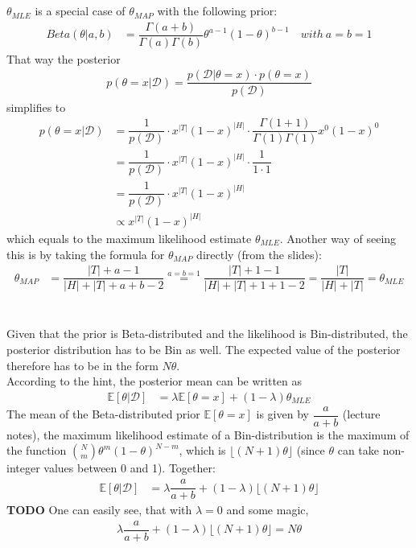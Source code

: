 \documentclass[11pt]{article}
\newcommand{\exercise}{\section{}}
\begin{document}
\exercise
$\theta_{MLE}$ is a special case of $\theta_{MAP}$ with the following prior:
\begin{align*}
	Beta(\theta|a,b) &= \dfrac{\Gamma(a+b)}{\Gamma(a)\Gamma(b)}\theta^{a-1}(1-\theta)^{b-1} \quad with\ a=b=1
\end{align*}
That way the posterior 
\begin{align*}
	p(\theta=x|\mathcal{D}) = \dfrac{p(\mathcal{D}|\theta=x) \cdot p(\theta=x)}{p(\mathcal{D})}
\end{align*}
simplifies to
\begin{align*}
	p(\theta=x|\mathcal{D}) &= \dfrac{1}{p(\mathcal{D})} \cdot x^{|T|} (1-x)^{|H|} \cdot \dfrac{\Gamma(1+1)}{\Gamma(1)\Gamma(1)} x^{0}(1-x)^{0} \\
	&= \dfrac{1}{p(\mathcal{D})} \cdot x^{|T|} (1-x)^{|H|} \cdot \dfrac{1}{1 \cdot 1} \\
	&= \dfrac{1}{p(\mathcal{D})} \cdot x^{|T|} (1-x)^{|H|} \\
	&\propto x^{|T|} (1-x)^{|H|}
\end{align*}
which equals to the maximum likelihood estimate $\theta_{MLE}$. Another way of seeing this is by taking the formula for $\theta_{MAP}$ directly (from the slides):
\begin{align*}
	\theta_{MAP} &= \dfrac{|T| + a - 1}{|H| + |T| + a + b - 2} \stackrel{a=b=1}{=} \dfrac{|T| + 1 - 1}{|H| + |T| + 1 + 1 - 2} = \dfrac{|T|}{|H| + |T|} = \theta_{MLE}
\end{align*}

\exercise
Given that the prior is Beta-distributed and the likelihood is Bin-distributed, the posterior distribution has to be Bin as well. The expected value of the posterior therefore has to be in the form $N\theta$.\\

\noindent According to the hint, the posterior mean can be written as
\begin{align*}
	\mathbb{E}[\theta|\mathcal{D}] &= \lambda\mathbb{E}[\theta = x] + (1-\lambda)\theta_{MLE}
\end{align*}
The mean of the Beta-distributed prior $\mathbb{E}[\theta = x]$ is given by $\dfrac{a}{a+b}$ (lecture notes), the maximum likelihood estimate of a Bin-distribution is the maximum of the function $\binom{N}{m}\theta^m(1-\theta)^{N-m}$, which is $\lfloor(N+1)\theta\rfloor$ (since $\theta$ can take non-integer values between 0 and 1). Together:
\begin{align*}
\mathbb{E}[\theta|\mathcal{D}] &= \lambda\dfrac{a}{a+b} + (1-\lambda)\lfloor(N+1)\theta\rfloor
\end{align*}
\textbf{TODO} One can easily see, that with $\lambda = 0$ and some magic,
\begin{align*}
	\lambda\dfrac{a}{a+b} + (1-\lambda)\lfloor(N+1)\theta\rfloor = N\theta
\end{align*}
\end{document}
